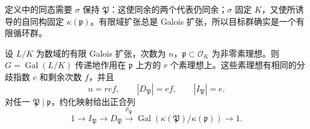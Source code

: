 
定义中的同态需要 \(\sigma\) 保持 \(\mathfrak P\)：这使同余的两个代表仍同余；\(\sigma\) 固定 \(K\)，又使所诱导的自同构固定 \(\kappa(\mathfrak p)\)。有限域扩张总是 Galois 扩张，所以目标群确实是一个有限循环群。

\begin{proposition}\label{b3:prop:arithmetic-decomposition-exact}
	设 \(L/K\) 为数域的有限 Galois 扩张，次数为 \(n\)，\(\mathfrak p\subset\mathcal O_K\) 为非零素理想。则 \(G=\operatorname{Gal}(L/K)\) 传递地作用在 \(\mathfrak p\) 上方的 \(r\) 个素理想上。这些素理想有相同的分歧指数 \(e\) 和剩余次数 \(f\)，并且
	\[
		n=ref,\qquad |D_{\mathfrak P}|=ef,\qquad |I_{\mathfrak P}|=e.
	\]
	对任一 \(\mathfrak P\mid\mathfrak p\)，约化映射给出正合列
	\[
		1\longrightarrow I_{\mathfrak P}\longrightarrow D_{\mathfrak P}
		\xrightarrow{\rho_{\mathfrak P}}
		\operatorname{Gal}(\kappa(\mathfrak P)/\kappa(\mathfrak p))
		\longrightarrow1.
	\]
\end{proposition}
